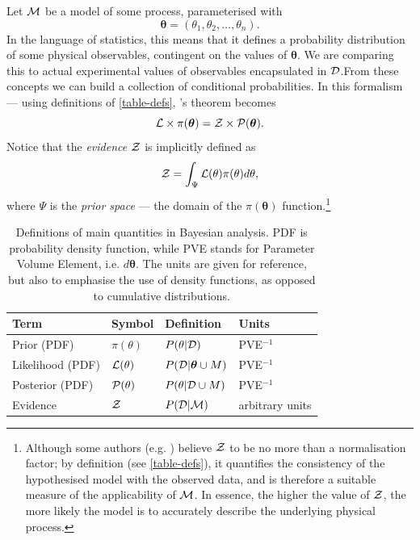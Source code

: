 \documentclass[usenatbib]{mnras}
\begin{document}
Let \({\cal M}\) be a model of some process, parameterised with
\[\bm{\theta} = (\theta_{1}, \theta_{2}, \ldots ,
   \theta_{n}).\] In the language of statistics, this means that it
defines a probability distribution of some physical observables,
contingent on the values of \(\bm{\theta}\). We are comparing
this to actual experimental values of observables encapsulated in
\({\cal D}\).From these concepts we can build a collection of
conditional probabilities. In this formalism --- using definitions of 
\autoref{table-defs}, \citeauthor{1763} 's theorem becomes
\begin{equation}
 {\cal L} \times \pi (\bm{\theta}) = {\cal Z}\times {\cal P} (\bm{\theta}).
\label{eq:bayes} 
\end{equation}
Notice that the \emph{evidence} \({\cal Z}\) is implicitly defined as
\begin{equation}\label{eq:def-z}
 {\cal Z} = \int_{\Psi} {\cal L}(\theta) \pi(\theta) d\theta, 
\end{equation}
where \(\Psi\) is the \emph{prior space} --- the domain of the
\(\pi(\bm{\theta})\) function.\footnote{Although some authors
(e.g. \citeauthor{jeffreys2010scientific}) believe \({\cal Z}\) to be
no more than a normalisation factor; by definition (see
\autoref{table-defs}), it quantifies the consistency of the
hypothesised model with the observed data, and is therefore a
suitable measure of the applicability of \({\cal M}\). In essence,
the higher the value of \({\cal Z}\), the more likely the model is
to accurately describe the underlying physical process.}

\begin{table}[htbp]
\caption{Definitions of main quantities in Bayesian analysis. PDF is probability density function, while PVE stands for Parameter Volume Element, i.e. \(d \bm{\theta}\). The units are given for reference, but also to emphasise the use of density functions, as opposed to cumulative distributions.  \label{table-defs}}
\centering
\begin{tabular}{llll}
\textbf{\textbf{Term}} & \textbf{\textbf{Symbol}} & \textbf{\textbf{Definition}} & \textbf{\textbf{Units}}\\
\hline
Prior (PDF) & \(\pi(\theta)\) & \(P ( \theta  \vert {\cal D})\) & PVE\(^{-1}\)\\
Likelihood (PDF) & \({\cal L}(\theta)\) & \(P ( {\cal D} \vert \bm{\theta} \cup M)\) & PVE\(^{-1}\)\\
Posterior (PDF) & \({\cal P}(\theta)\) & \(P ( \theta \vert {\cal D} \cup M)\) & PVE\(^{-1}\)\\
Evidence & \({\cal Z}\) & \(P ( {\cal D} \vert {\cal M})\) & arbitrary units\\
\end{tabular}
\end{table}
\end{document}
